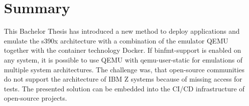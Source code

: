 \chapter{Summary}\label{ch:summary}

This Bachelor Thesis has introduced a new method to deploy applications and emulate the s390x architecture with a combination of the emulator QEMU together with the container technology Docker.
If binfmt-support is enabled on any system, it is possible to use QEMU with qemu-user-static for emulations of multiple system architectures. 
The challenge was, that open-source communities do not support the architecture of IBM Z systems because of missing access for tests. The presented solution can be embedded into the CI/CD infrastructure of open-source projects.
